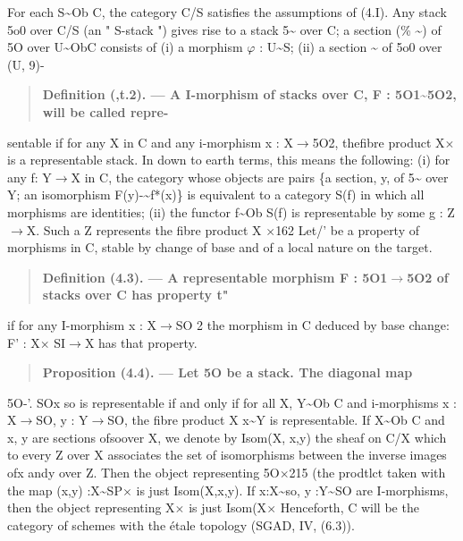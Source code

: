 \documentclass[11pt]{article}
\theoremstyle{plain}
\theoremstyle{definition}
\theoremstyle{remark}
\begin{document}
For each S\textasciitilde{}Ob C, the category C/S satisfies the assumptions of (4.I). Any stack 5o0 over C/S (an " S-stack ") gives rise to a stack 5\textasciitilde{} over C; a section (\% \textasciitilde{}) of 5O over U\textasciitilde{}ObC consists of (i) a morphism $\varphi$ : U\textasciitilde{}S; (ii) a section \textasciitilde{} of 5o0 over (U, 9)-

\begin{quote}\textbf{Definition (,t.2). --- A I-morphism of stacks over C, F : 5O1\textasciitilde{}5O2, will be called repre-}\end{quote}
sentable if for any X in C and any i-morphism x : X$\to$5O2, thefibre product X$\times$ is a representable stack. In down to earth terms, this means the following: (i) for any f: Y$\to$X in C, the category whose objects are pairs \{a section, y, of 5\textasciitilde{} over Y; an isomorphism F(y)-\textasciitilde{}f*(x)\} is equivalent to a category S(f) in which all morphisms are identities; (ii) the functor f\textasciitilde{}Ob S(f) is representable by some g : Z$\to$X. Such a Z represents the fibre product X $\times$162 Let/' be a property of morphisms in C, stable by change of base and of a local nature on the target.

\begin{quote}\textbf{Definition (4.3). --- A representable morphism F : 5O1$\to$5O2 of stacks over C has property t"}\end{quote}
if for any I-morphism x : X$\to$SO 2 the morphism in C deduced by base change: F' : X$\times$ SI$\to$X has that property.

\begin{quote}\textbf{Proposition (4.4). --- Let 5O be a stack. The diagonal map}\end{quote}
5O-'. SOx so is representable if and only if for all X, Y\textasciitilde{}Ob C and i-morphisms x : X$\to$SO, y : Y$\to$SO, the fibre product X x\textasciitilde{}Y is representable. If X\textasciitilde{}Ob C and x, y are sections ofsoover X, we denote by Isom(X, x,y) the sheaf on C/X which to every Z over X associates the set of isomorphisms between the inverse images ofx andy over Z. Then the object representing 5O$\times$215 (the prodtlct taken with the map (x,y) :X\textasciitilde{}SP$\times$ is just Isom(X,x,y). If x:X\textasciitilde{}so, y :Y\textasciitilde{}SO are I-morphisms, then the object representing X$\times$ is just Isom(X$\times$ Henceforth, C will be the category of schemes with the \'etale topology (SGAD, IV, (6.3)).
\end{document}
